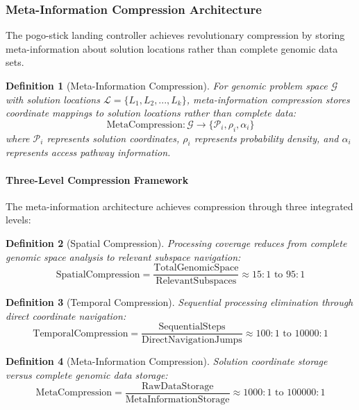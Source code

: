 \documentclass[12pt,a4paper]{article}
\newtheorem{definition}{Definition}
\begin{document}
\subsubsection{Meta-Information Compression Architecture}

The pogo-stick landing controller achieves revolutionary compression by storing meta-information about solution locations rather than complete genomic data sets.

\begin{definition}[Meta-Information Compression]
For genomic problem space $\mathcal{G}$ with solution locations $\mathcal{L} = \{L_1, L_2, ..., L_k\}$, meta-information compression stores coordinate mappings to solution locations rather than complete data:
\begin{equation}
\text{MetaCompression}: \mathcal{G} \rightarrow \{\mathcal{P}_i, \rho_i, \alpha_i\}
\end{equation}
where $\mathcal{P}_i$ represents solution coordinates, $\rho_i$ represents probability density, and $\alpha_i$ represents access pathway information.
\end{definition}

\paragraph{Three-Level Compression Framework}

The meta-information architecture achieves compression through three integrated levels:

\begin{definition}[Spatial Compression]
Processing coverage reduces from complete genomic space analysis to relevant subspace navigation:
\begin{equation}
\text{SpatialCompression} = \frac{\text{TotalGenomicSpace}}{\text{RelevantSubspaces}} \approx 15:1 \text{ to } 95:1
\end{equation}
\end{definition}

\begin{definition}[Temporal Compression]  
Sequential processing elimination through direct coordinate navigation:
\begin{equation}
\text{TemporalCompression} = \frac{\text{SequentialSteps}}{\text{DirectNavigationJumps}} \approx 100:1 \text{ to } 10000:1
\end{equation}
\end{definition}

\begin{definition}[Meta-Information Compression]
Solution coordinate storage versus complete genomic data storage:
\begin{equation}
\text{MetaCompression} = \frac{\text{RawDataStorage}}{\text{MetaInformationStorage}} \approx 1000:1 \text{ to } 100000:1
\end{equation}
\end{definition}
\end{document}
